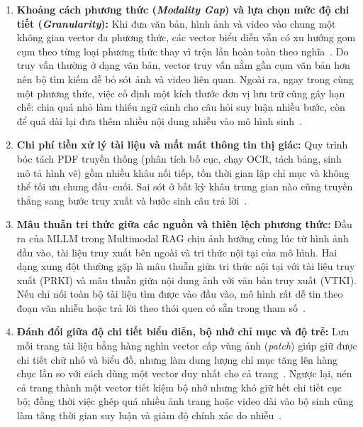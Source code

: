 \begin{enumerate}
    \item \textbf{Khoảng cách phương thức (\textit{Modality Gap}) và lựa chọn mức độ chi tiết (\textit{Granularity}):} Khi đưa văn bản, hình ảnh và video vào chung một không gian vector đa phương thức, các vector biểu diễn vẫn có xu hướng gom cụm theo từng loại phương thức thay vì trộn lẫn hoàn toàn theo nghĩa~\cite{liang2022mind,yeo2026universalrag}. Do truy vấn thường ở dạng văn bản, vector truy vấn nằm gần cụm văn bản hơn nên bộ tìm kiếm dễ bỏ sót ảnh và video liên quan. Ngoài ra, ngay trong cùng một phương thức, việc cố định một kích thước đơn vị lưu trữ cũng gây hạn chế: chia quá nhỏ làm thiếu ngữ cảnh cho câu hỏi suy luận nhiều bước, còn để quá dài lại đưa thêm nhiều nội dung nhiễu vào mô hình sinh~\cite{yeo2026universalrag}.

    \item \textbf{Chi phí tiền xử lý tài liệu và mất mát thông tin thị giác:} Quy trình bóc tách PDF truyền thống (phân tích bố cục, chạy OCR, tách bảng, sinh mô tả hình vẽ) gồm nhiều khâu nối tiếp, tốn thời gian lập chỉ mục và không thể tối ưu chung đầu--cuối. Sai sót ở bất kỳ khâu trung gian nào cũng truyền thẳng sang bước truy xuất và bước sinh câu trả lời~\cite{faysse2025colpali,yu2025visrag}.

    \item \textbf{Mâu thuẫn tri thức giữa các nguồn và thiên lệch phương thức:} Đầu ra của MLLM trong Multimodal RAG chịu ảnh hưởng cùng lúc từ hình ảnh đầu vào, tài liệu truy xuất bên ngoài và tri thức nội tại của mô hình. Hai dạng xung đột thường gặp là mâu thuẫn giữa tri thức nội tại với tài liệu truy xuất (PRKI) và mâu thuẫn giữa nội dung ảnh với văn bản truy xuất (VTKI). Nếu chỉ nối toàn bộ tài liệu tìm được vào đầu vào, mô hình rất dễ tin theo đoạn văn nhiễu hoặc trả lời theo thói quen có sẵn trong tham số~\cite{tian2025coremmrag,abootorabi2025ask}.

    \item \textbf{Đánh đổi giữa độ chi tiết biểu diễn, bộ nhớ chỉ mục và độ trễ:} Lưu mỗi trang tài liệu bằng hàng nghìn vector cấp vùng ảnh (\textit{patch}) giúp giữ được chi tiết chữ nhỏ và biểu đồ, nhưng làm dung lượng chỉ mục tăng lên hàng chục lần so với cách dùng một vector duy nhất cho cả trang~\cite{faysse2025colpali,yu2025visrag}. Ngược lại, nén cả trang thành một vector tiết kiệm bộ nhớ nhưng khó giữ hết chi tiết cục bộ; đồng thời việc ghép quá nhiều ảnh trang hoặc video dài vào bộ sinh cũng làm tăng thời gian suy luận và giảm độ chính xác do nhiễu~\cite{abootorabi2025ask,yu2025visrag}.
\end{enumerate}

